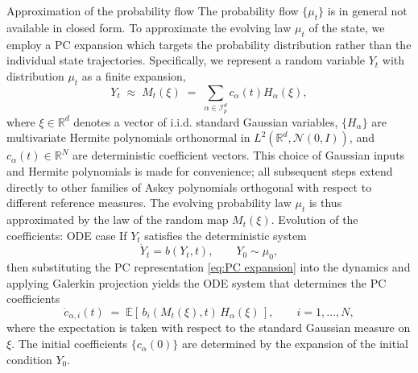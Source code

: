 \documentclass[11pt, a4paper, oneside, reqno]{amsart}
\makeatletter
\def\subsection{\@startsection{subsection}{2}%
	\z@{.5\linespacing\@plus.7\linespacing}{.5\linespacing}%
	{\normalfont\large\bfseries}}
\def\subsubsection{\@startsection{subsubsection}{3}%
	\z@{.5\linespacing\@plus.7\linespacing}{.5\linespacing}%
	{\normalfont\itshape}}
\makeatother
\begin{document}
\subsection{Approximation of the probability flow}
\noindent The probability flow $\{\mu_t\}$ is in general not available in closed form. To approximate the evolving law $\mu_t$ of the state, we employ a PC expansion which targets the probability distribution rather than the individual state trajectories. 
Specifically, we represent a random variable $Y_t$ with distribution $\mu_t$ as a finite expansion,
\begin{equation}\label{eq:PC expansion}
Y_t \;\approx\; M_t(\xi) \;=\; \sum_{\alpha\in\mathcal{I}_p^d} c_{\alpha}(t) H_\alpha(\xi),
\end{equation}
where $\xi\in\mathbb{R}^d$ denotes a vector of i.i.d. standard Gaussian variables, $\{H_\alpha\}$ are multivariate Hermite polynomials orthonormal in $L^2(\mathbb{R}^d,\mathcal{N}(0,I))$, and $c_\alpha(t)\in\mathbb{R}^N$ are deterministic coefficient vectors.  This choice of Gaussian inputs and Hermite polynomials is made for convenience; all subsequent steps extend directly to other families of Askey polynomials orthogonal with respect to different reference measures.  
The evolving probability law $\mu_t$ is thus approximated by the law of the random map $M_t(\xi)$.  
\subsubsection{Evolution of the coefficients: ODE case}
\noindent If $Y_t$ satisfies the deterministic system
\[
\dot{Y}_t = b(Y_t,t), \qquad Y_0\sim \mu_0,
\]
then substituting the PC representation \eqref{eq:PC expansion} into the dynamics and applying Galerkin projection yields the ODE system that determines the PC coefficients
\begin{equation}\label{eq:coeff evolution ODE}
\dot{c}_{\alpha,i}(t) \;=\; \mathbb{E}\left[\, b_i(M_t(\xi),t) \, H_\alpha(\xi)\,\right],
\qquad i=1,\dots,N,
\end{equation}
where the expectation is taken with respect to the standard Gaussian measure on $\xi$.  
The initial coefficients $\{c_\alpha(0)\}$ are determined by the expansion of the initial condition $Y_0$.
\end{document}
